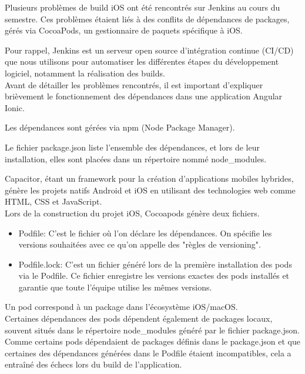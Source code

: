 \documentclass{article}
\begin{document}
Plusieurs problèmes de build iOS ont été rencontrés sur Jenkins au cours du semestre. Ces problèmes étaient liés à des conflits de dépendances de packages, gérés via CocoaPods, un gestionnaire de paquets spécifique à iOS.

Pour rappel, Jenkins est un serveur open source d'intégration continue (CI/CD) que nous utilisons pour automatiser les différentes étapes du développement logiciel, notamment la réalisation des builds. \\

Avant de détailler les problèmes rencontrés, il est important d'expliquer brièvement le fonctionnement des dépendances dans une application Angular Ionic. 

Les dépendances sont gérées via npm (Node Package Manager). 

Le fichier package.json liste l'ensemble des dépendances, et lors de leur installation, elles sont placées dans un répertoire nommé node\_modules.

Capacitor, étant un framework pour la création d'applications mobiles hybrides, génère les projets natifs Android et iOS en utilisant des technologies web comme HTML, CSS et JavaScript. \\

Lors de la construction du projet iOS, Cocoapods génère deux fichiers.

\begin{itemize}
    \item Podfile: C'est le fichier où l'on déclare les dépendances. On spécifie les versions souhaitées avec ce qu'on appelle des "règles de versioning".
    \item Podfile.lock: C'est un fichier généré lors de la première installation des pods via le Podfile. Ce fichier enregistre les versions exactes des pods installés et garantie que toute l'équipe utilise les mêmes versions.
\end{itemize}

Un pod correspond à un package dans l'écosystème iOS/macOS. \\ 

Certaines dépendances des pods dépendent également de packages locaux, souvent situés dans le répertoire node\_modules généré par le fichier package.json. \\

Comme certains pods dépendaient de packages définis dans le package.json et que certaines des dépendances générées dans le Podfile étaient incompatibles, cela a entraîné des échecs lors du build de l'application.
\end{document}
